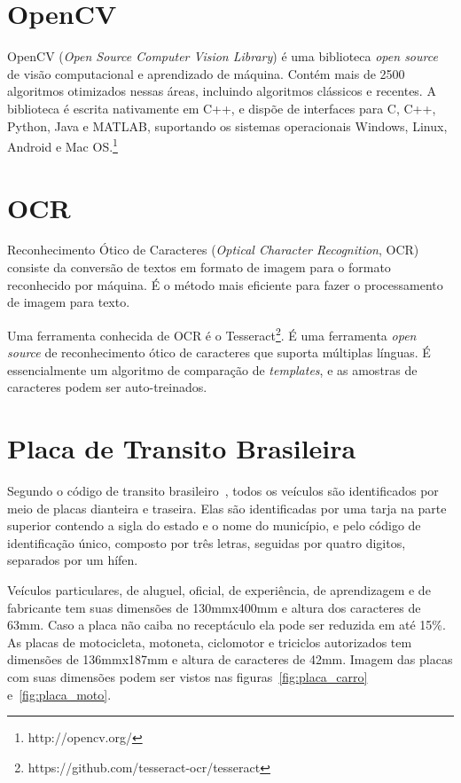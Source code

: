 \section{OpenCV}
\label{sec:opencv}

OpenCV (\emph{Open Source Computer Vision Library}) é uma biblioteca \emph{open
source} de visão computacional e aprendizado de máquina. Contém mais de 2500
algoritmos otimizados nessas áreas, incluindo algoritmos clássicos e recentes. A
biblioteca é escrita nativamente em C++, e dispõe de interfaces para C, C++,
Python, Java e MATLAB, suportando os sistemas operacionais Windows, Linux,
Android e Mac OS.\footnote{http://opencv.org/}

\section{OCR}
\label{sec:ocr}

Reconhecimento Ótico de Caracteres (\emph{Optical Character Recognition}, OCR)
consiste da conversão de textos em formato de imagem para o formato reconhecido
por máquina. É o método mais eficiente para fazer o processamento de imagem para
texto.~\cite{mohit2015designing}

Uma ferramenta conhecida de OCR é o
Tesseract\footnote{https://github.com/tesseract-ocr/tesseract}. É uma ferramenta
\emph{open source} de reconhecimento ótico de caracteres que suporta múltiplas
línguas.  É essencialmente um algoritmo de comparação de \emph{templates}, e as
amostras de caracteres podem ser auto-treinados.~\cite{ho2016intelligent}

\section{Placa de Transito Brasileira}
\label{sec:placabr}

Segundo o código de transito brasileiro~\cite{brasil1997lei}, todos os veículos
são identificados por meio de placas dianteira e traseira. Elas são
identificadas por uma tarja na parte superior contendo a sigla do estado e o
nome do município, e pelo código de identificação único, composto por três
letras, seguidas por quatro digitos, separados por um hífen.

Veículos particulares, de aluguel, oficial, de experiência, de aprendizagem e de
fabricante tem suas dimensões de 130mmx400mm e altura dos caracteres de 63mm.
Caso a placa não caiba no receptáculo ela pode ser reduzida em até 15\%. As
placas de motocicleta, motoneta, ciclomotor e triciclos autorizados tem
dimensões de 136mmx187mm e altura de caracteres de 42mm. Imagem das placas com
suas dimensões podem ser vistos nas figuras~\ref{fig:placa_carro}
e~\ref{fig:placa_moto}.

